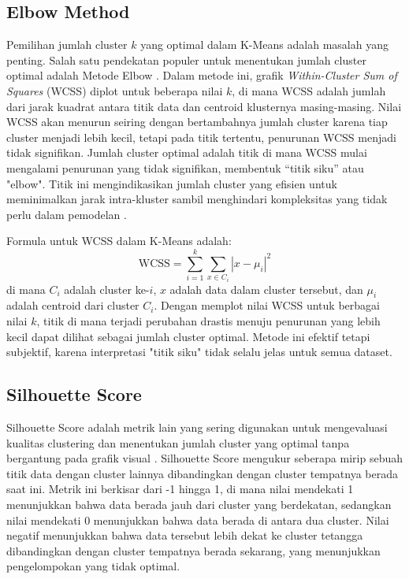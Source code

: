\subsection{Elbow Method}
Pemilihan jumlah cluster $k$ yang optimal dalam K-Means adalah masalah yang penting. Salah satu pendekatan populer untuk menentukan jumlah cluster optimal adalah Metode Elbow \cite{ElbowMethod}. Dalam metode ini, grafik \textit{Within-Cluster Sum of Squares} (WCSS) diplot untuk beberapa nilai $k$, di mana WCSS adalah jumlah dari jarak kuadrat antara titik data dan centroid klusternya masing-masing. Nilai WCSS akan menurun seiring dengan bertambahnya jumlah cluster karena tiap cluster menjadi lebih kecil, tetapi pada titik tertentu, penurunan WCSS menjadi tidak signifikan. Jumlah cluster optimal adalah titik di mana WCSS mulai mengalami penurunan yang tidak signifikan, membentuk “titik siku” atau "elbow". Titik ini mengindikasikan jumlah cluster yang efisien untuk meminimalkan jarak intra-kluster sambil menghindari kompleksitas yang tidak perlu dalam pemodelan \cite{KodinariyaElbowMethod}.

Formula untuk WCSS dalam K-Means adalah:
\[
\text{WCSS} = \sum_{i=1}^k \sum_{x \in C_i} |x - \mu_i|^2
\]
di mana $C_i$ adalah cluster ke-$i$, $x$ adalah data dalam cluster tersebut, dan $\mu_i$ adalah centroid dari cluster $C_i$. Dengan memplot nilai WCSS untuk berbagai nilai $k$, titik di mana terjadi perubahan drastis menuju penurunan yang lebih kecil dapat dilihat sebagai jumlah cluster optimal. Metode ini efektif tetapi subjektif, karena interpretasi "titik siku" tidak selalu jelas untuk semua dataset.

\subsection{Silhouette Score}
Silhouette Score adalah metrik lain yang sering digunakan untuk mengevaluasi kualitas clustering dan menentukan jumlah cluster yang optimal tanpa bergantung pada grafik visual \cite{Januzaj_Beqiri_Luma_2023}. Silhouette Score mengukur seberapa mirip sebuah titik data dengan cluster lainnya dibandingkan dengan cluster tempatnya berada saat ini. Metrik ini berkisar dari -1 hingga 1, di mana nilai mendekati 1 menunjukkan bahwa data berada jauh dari cluster yang berdekatan, sedangkan nilai mendekati 0 menunjukkan bahwa data berada di antara dua cluster. Nilai negatif menunjukkan bahwa data tersebut lebih dekat ke cluster tetangga dibandingkan dengan cluster tempatnya berada sekarang, yang menunjukkan pengelompokan yang tidak optimal.

